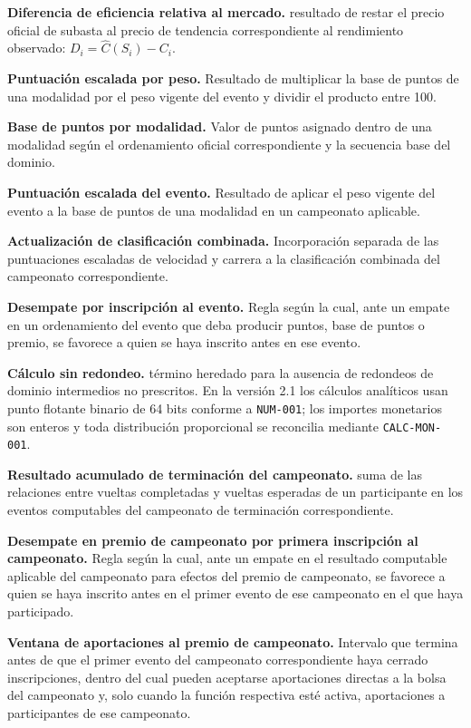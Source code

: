 \documentclass[10pt,letterpaper]{article}
\begin{document}
\noindent\textbf{Diferencia de eficiencia relativa al mercado.} resultado de restar el precio oficial de subasta al precio de tendencia correspondiente al rendimiento observado: $D_i=\widehat C(S_i)-C_i$.\par
\noindent\textbf{Puntuación escalada por peso.} Resultado de multiplicar la base de puntos de una modalidad por el peso vigente del evento y dividir el producto entre 100.\par
\noindent\textbf{Base de puntos por modalidad.} Valor de puntos asignado dentro de una modalidad según el ordenamiento oficial correspondiente y la secuencia base del dominio.\par
\noindent\textbf{Puntuación escalada del evento.} Resultado de aplicar el peso vigente del evento a la base de puntos de una modalidad en un campeonato aplicable.\par
\noindent\textbf{Actualización de clasificación combinada.} Incorporación separada de las puntuaciones escaladas de velocidad y carrera a la clasificación combinada del campeonato correspondiente.\par
\noindent\textbf{Desempate por inscripción al evento.} Regla según la cual, ante un empate en un ordenamiento del evento que deba producir puntos, base de puntos o premio, se favorece a quien se haya inscrito antes en ese evento.\par
\noindent\textbf{Cálculo sin redondeo.} término heredado para la ausencia de redondeos de dominio intermedios no prescritos. En la versión 2.1 los cálculos analíticos usan punto flotante binario de 64 bits conforme a \texttt{NUM-001}; los importes monetarios son enteros y toda distribución proporcional se reconcilia mediante \texttt{CALC-MON-001}.\par
\noindent\textbf{Resultado acumulado de terminación del campeonato.} suma de las relaciones entre vueltas completadas y vueltas esperadas de un participante en los eventos computables del campeonato de terminación correspondiente.\par
\noindent\textbf{Desempate en premio de campeonato por primera inscripción al campeonato.} Regla según la cual, ante un empate en el resultado computable aplicable del campeonato para efectos del premio de campeonato, se favorece a quien se haya inscrito antes en el primer evento de ese campeonato en el que haya participado.\par
\noindent\textbf{Ventana de aportaciones al premio de campeonato.} Intervalo que termina antes de que el primer evento del campeonato correspondiente haya cerrado inscripciones, dentro del cual pueden aceptarse aportaciones directas a la bolsa del campeonato y, solo cuando la función respectiva esté activa, aportaciones a participantes de ese campeonato.\par
\end{document}
